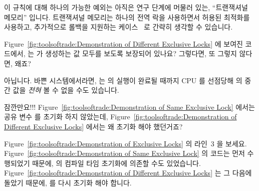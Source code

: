 \begin{enumerate}
	이 규칙에 대해 하나의 가능한 예외는 아직은 연구 단계에 머물러 있는,
	``트랜잭셔널 메모리'' 입니다.
	트랜잭셔널 메모리는 하나의 전역 락을 사용하면서 허용된 최적화를
	사용하고, 추가적으로 롤백을 지원하는 케이스~\cite{HansJBoehm2009HOTPAR}
	로 간략히 생각할 수 있습니다.

\QuickQ{}
	Figure~\ref{fig:toolsoftrade:Demonstration of Different Exclusive
	Locks} 에 보여진 코드에서,  는  가
	생성하는 값 모두를 보도록 보장되어 있나요?
	그렇다면, 또 그렇지 않다면, 왜죠?

\QuickA{}
	아닙니다.
	바쁜 시스템에서라면,  는  의 실행이
	완료될 때까지 CPU 를 선점당해  의  중간 값을
	\emph{전혀} 볼 수 없을 수도 있습니다.

\QuickQ{}
	잠깐만요!!!
	Figure~\ref{fig:toolsoftrade:Demonstration of Same Exclusive Lock}
	에서는 공유 변수  를 초기화 하지 않았는데, 
	Figure~\ref{fig:toolsoftrade:Demonstration of Different Exclusive
	Locks} 에서는 왜 초기화 해야 했던거죠?

\QuickA{}
	Figure~\ref{fig:toolsoftrade:Demonstration of Exclusive Locks} 의
	라인~3 을 보세요.
	Figure~\ref{fig:toolsoftrade:Demonstration of Same Exclusive Lock} 의
	코드는 먼저 수행되었기 때문에,  의 컴파일 타임 초기화에 의존할
	수도 있었습니다.
	Figure~\ref{fig:toolsoftrade:Demonstration of Different Exclusive
	Locks} 는 그 다음에 돌았기 때문에,  를 다시 초기화 해야 합니다.


\end{enumerate}
